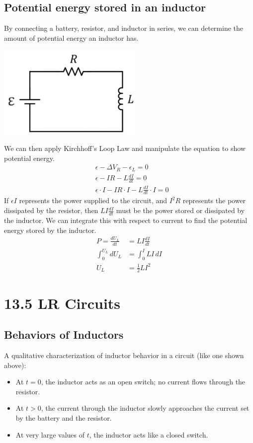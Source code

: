 \documentclass[12pt, titlepage]{article}
\begin{document}
\subsection*{Potential energy stored in an inductor}

By connecting a battery, resistor, and inductor in series, we can determine the amount of potential energy an inductor has. 
\begin{center}
    \includegraphics*[height=4.5cm]{media/potentialenergy.png}
\end{center}
We can then apply Kirchhoff's Loop Law and manipulate the equation to show potential energy.
\begin{align*}
    & \epsilon - \Delta V_R - \epsilon_L=0 \\
    & \epsilon - IR - L \frac{dI}{dt} =0 \\
    & \epsilon \cdot I - IR \cdot I - L \frac{dI}{dt} \cdot I=0
\end{align*}
If $\epsilon I$ represents the power supplied to the circuit, and $I^2R$ represents the power dissipated by the resistor, then $LI\frac{dI}{dt}$ must be the power stored or dissipated by the inductor. We can integrate this with respect to current to find the potential energy stored by the inductor.
\begin{align*}
    P = \frac{dU_L}{dt} &= LI\frac{dI}{dt} \\
    \int_{0}^{U_L} dU_L & = \int_{0}^{I}LI \, dI \\
    U_L &= \boxed{\frac{1}{2}LI^2}
\end{align*}

\section*{13.5 LR Circuits}
\subsection*{Behaviors of Inductors}
A qualitative characterization of inductor behavior in a circuit (like one shown above):
\begin{itemize}
    \item At $t=0$, the inductor acts as an open switch; no current flows through the resistor.
    \item At $t>0$, the current through the inductor slowly approaches the current set by the battery and the resistor.
    \item At very large values of $t$, the inductor acts like a closed switch.
\end{itemize}
\end{document}

